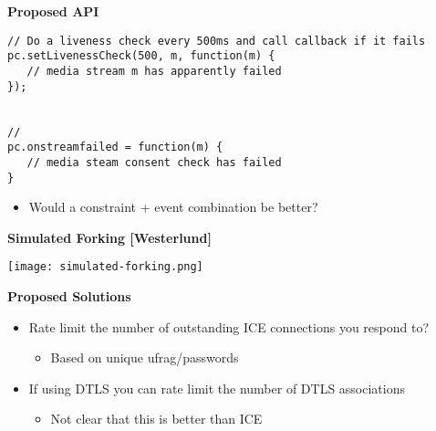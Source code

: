 \documentclass[helvetica]{seminar}
\newcommand{\heading}[1]{%
  \begin{center} 
    \large\bf 
    #1 
  \end{center} 
  \vspace{.4 in}}
\begin{document}
\begin{slide}
\heading{Proposed API}

\begin{verbatim}
// Do a liveness check every 500ms and call callback if it fails
pc.setLivenessCheck(500, m, function(m) {
   // media stream m has apparently failed
});


//
pc.onstreamfailed = function(m) {
   // media steam consent check has failed
}
\end{verbatim}

\begin{itemize}
\item Would a constraint + event combination be better?
\end{itemize}

\end{slide}


\begin{slide}
\heading{Simulated Forking [Westerlund]}

{\centering
\noindent\texttt{[image: simulated-forking.png]}
}

\end{slide}


\begin{slide}
\heading{Proposed Solutions}

\begin{itemize}
\item Rate limit the number of outstanding ICE connections you respond to?
  \begin{itemize}
  \item Based on unique ufrag/passwords
  \end{itemize}

\item If using DTLS you can rate limit the number of DTLS associations
  \begin{itemize}
  \item Not clear that this is better than ICE
  \end{itemize}
\end{itemize}
\end{slide}
\end{document}
